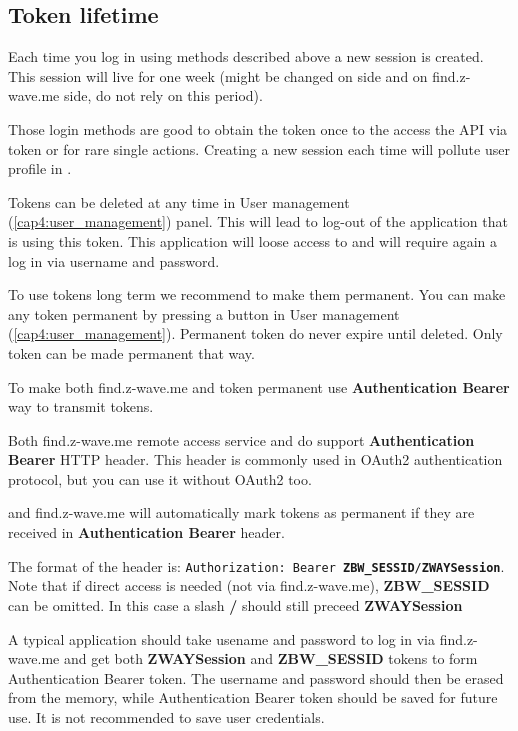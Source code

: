 \subsection{Token lifetime}
\label{cap:authentication_usage}

Each time you log in using methods described above a new session is created. This session will live for one week (might be changed on \zway side and on find.z-wave.me side, do not rely on this period).

Those login methods are good to obtain the token once to the access the API via token or for rare single actions. Creating a new session each time will pollute user profile in \zway.

Tokens can be deleted at any time in User management (\ref{cap4:user_management}) panel. This will lead to log-out of the application that is using this token. This application will loose access to \zway and will require again a log in via username and password.

To use tokens long term we recommend to make them permanent. You can make any token permanent by pressing a button in User management (\ref{cap4:user_management}).
Permanent token do never expire until deleted. Only \zway token can be made permanent that way.

To make both find.z-wave.me and \zway token permanent use \textbf{Authentication Bearer} way to transmit tokens.

Both find.z-wave.me remote access service and \zway do support \textbf{Authentication Bearer} HTTP header. This header is commonly used in OAuth2 authentication protocol, but you can use it without OAuth2 too.

\zway and find.z-wave.me will automatically mark tokens as permanent if they are received in \textbf{Authentication Bearer} header.

The format of the header is: \texttt{Authorization: Bearer \textbf{ZBW\_SESSID}/\textbf{ZWAYSession}}.
Note that if direct access is needed (not via find.z-wave.me), \textbf{ZBW\_SESSID} can be omitted.
In this case a slash \textbf{/} should still preceed \textbf{ZWAYSession}

A typical application should take usename and password to log in via find.z-wave.me and get both \textbf{ZWAYSession} and \textbf{ZBW\_SESSID} tokens to form Authentication Bearer token.
The username and password should then be erased from the memory, while Authentication Bearer token should be saved for future use. It is not recommended to save user credentials.

